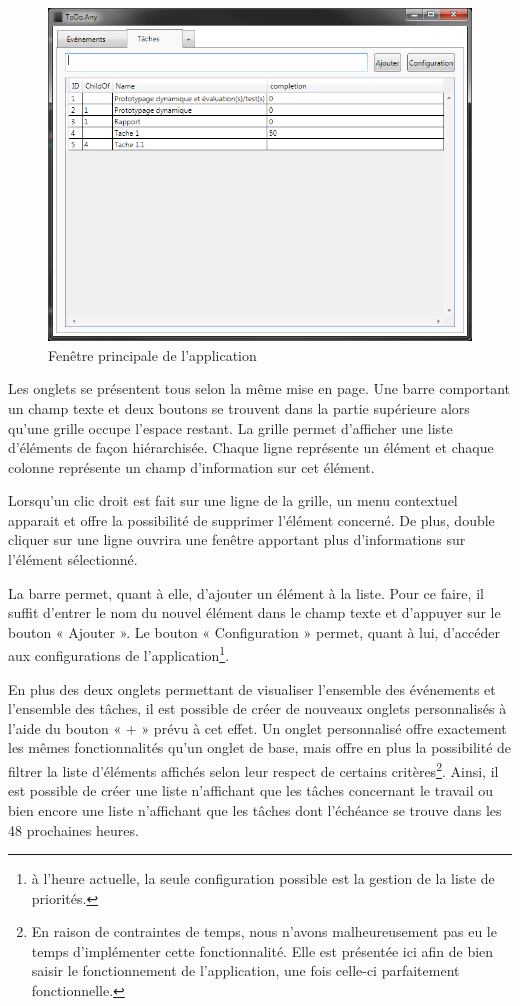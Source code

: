 \documentclass[letterpaper, oneside, 12pt, these, creativecommons]{thETS}
\begin{document}
\begin{figure}
    \includegraphics[scale=0.6]{fenetre_main.png}
    \caption{Fenêtre principale de l'application}
\end{figure}

Les onglets se présentent tous selon la même mise en page. Une barre comportant un champ texte et deux boutons se trouvent dans la partie supérieure alors qu'une grille occupe l'espace restant. La grille permet d'afficher une liste d'éléments de façon hiérarchisée. Chaque ligne représente un élément et chaque colonne représente un champ d'information sur cet élément.

Lorsqu'un clic droit est fait sur une ligne de la grille, un menu contextuel apparait et offre la possibilité de supprimer l'élément concerné. De plus, double cliquer sur une ligne ouvrira une fenêtre apportant plus d'informations sur l'élément sélectionné.

La barre permet, quant à elle, d'ajouter un élément à la liste. Pour ce faire, il suffit d'entrer le nom du nouvel élément dans le champ texte et d'appuyer sur le bouton « Ajouter ». Le bouton « Configuration » permet, quant à lui, d'accéder aux configurations de l'application\footnote{à l'heure actuelle, la seule configuration possible est la gestion de la liste de priorités.}.

En plus des deux onglets permettant de visualiser l'ensemble des événements et l'ensemble des tâches, il est possible de créer de nouveaux onglets personnalisés à l'aide du bouton « + » prévu à cet effet. Un onglet personnalisé offre exactement les mêmes fonctionnalités qu'un onglet de base, mais offre en plus la possibilité de filtrer la liste d'éléments affichés selon leur respect de certains critères\footnote{En raison de contraintes de temps, nous n'avons malheureusement pas eu le temps d'implémenter cette fonctionnalité. Elle est présentée ici afin de bien saisir le fonctionnement de l'application, une fois celle-ci parfaitement fonctionnelle.}. Ainsi, il est possible de créer une liste n'affichant que les tâches concernant le travail ou bien encore une liste n'affichant que les tâches dont l'échéance se trouve dans les 48 prochaines heures.
\end{document}
